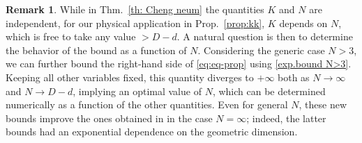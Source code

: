 \documentclass[12pt]{article}
\theoremstyle{plain}
\theoremstyle{definition}
\newtheorem{remark}[lemma]{Remark}
\begin{document}
\begin{remark}
While in Thm.~\ref{th: Cheng neum} the quantities $K$ and $N$ are independent, for our physical application in Prop.~\ref{prop:kk}, $K$ depends on $N$, which is free to take any value $> D-d$. A natural question is then to determine the behavior of the bound as a function of $N$. Considering the generic case $N>3$, we can further bound the right-hand side of \eqref{eq:eq-prop} using \eqref{exp.bound N>3}. Keeping all other variables fixed, this quantity diverges to $+\infty$ both as $N \to \infty$ and $N \to D-d$, implying an optimal value of $N$, which can be determined numerically as a function of the other quantities. Even for general $N$, these new bounds improve the ones obtained in \cite[Thm.~2]{deluca-t-leaps} in the case $N = \infty$; indeed, the latter bounds had an exponential dependence on the geometric dimension.

\end{remark}



\end{document}
